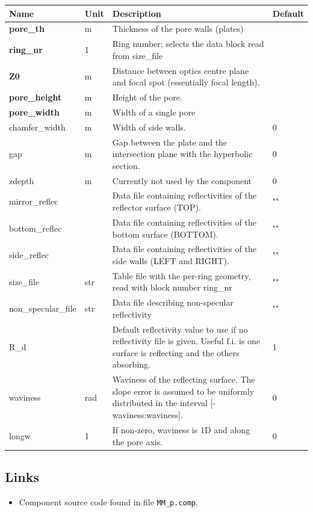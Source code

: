 \begin{longtable}{p{}p{}p{}p{}}
\toprule
\textbf{Name} & \textbf{Unit} & \textbf{Description} & \textbf{Default} \\
\midrule
\endhead
\textbf{pore\_th} & m & Thickness of the pore walls (plates) &  \\
\textbf{ring\_nr} & 1 & Ring number; selects the data block read from size\_file &  \\
\textbf{Z0} & m & Distance between optics centre plane and focal spot (essentially focal length). &  \\
\textbf{pore\_height} & m & Height of the pore. &  \\
\textbf{pore\_width} & m & Width of a single pore &  \\
chamfer\_width & m & Width of side walls. & 0 \\
gap & m & Gap between the plate and the intersection plane with the hyperbolic section. & 0 \\
zdepth & m & Currently not used by the component & 0 \\
mirror\_reflec &   & Data file containing reflectivities of the reflector surface (TOP). & "" \\
bottom\_reflec &   & Data file containing reflectivities of the bottom surface (BOTTOM). & "" \\
side\_reflec &   & Data file containing reflectivities of the side walls (LEFT and RIGHT). & "" \\
size\_file & str & Table file with the per-ring geometry, read with block number ring\_nr & "" \\
non\_specular\_file & str & Data file describing non-specular reflectivity & "" \\
R\_d &   & Default reflectivity value to use if no reflectivity file is given. Useful f.i. is one surface is reflecting and the others absorbing. & 1 \\
waviness & rad & Waviness of the reflecting surface. The slope error is assumed to be uniformly distributed in the interval [-waviness:waviness]. & 0 \\
longw & 1 & If non-zero, waviness is 1D and along the pore axis. & 0 \\
\bottomrule
\end{longtable}

\subsection*{Links}
\begin{itemize}
  \item Component source code found in file \texttt{MM\_p.comp}.
\end{itemize}
